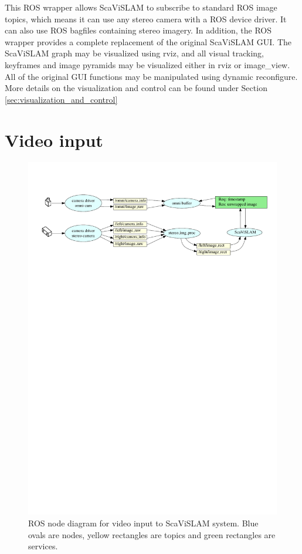 This ROS wrapper allows ScaViSLAM to subscribe to standard ROS image topics, which means it can use any stereo camera with a ROS device driver.  It can also use ROS bagfiles containing stereo imagery.  In addition, the ROS wrapper provides a complete replacement of the original ScaViSLAM GUI.  The ScaViSLAM graph may be visualized using rviz, and all visual tracking, keyframes and image pyramids may be visualized either in rviz or image\_view.  All of the original GUI functions may be manipulated using dynamic reconfigure.  More details on the visualization and control can be found under Section \ref{sec:visualization_and_control}

\section{Video input}

\begin{figure}[h]
  \centering
    \includegraphics[width=1.0\textwidth]{chapters/images/input_architecture}
  \caption{ROS node diagram for video input to ScaViSLAM system.  Blue ovals are nodes, yellow rectangles are topics and green rectangles are services.}
  \label{fig:input_architecture}
\end{figure}

